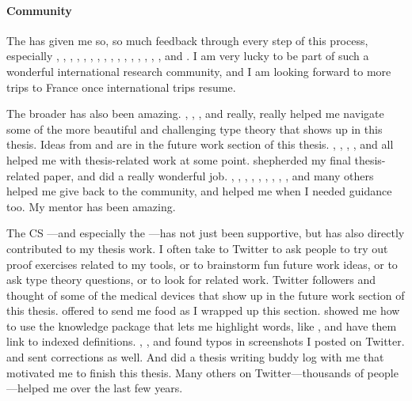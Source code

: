 \paragraph{Community}
The  has given me so, so much feedback through every step of this process,
especially , , , , , , , , , , , , , , , , and .
I am very lucky to be part of such a wonderful international research community, and I am looking forward to more trips to France
once international trips resume.

The broader  has also been amazing.
, , , and  really, really helped me navigate
some of the more beautiful and challenging type theory that shows up in this thesis.
Ideas from  and  are in the future work section of this thesis.
, , , , and  all helped me with
thesis-related work at some point.
 shepherded my final thesis-related paper, and did a really wonderful job.
, , , ,
, , , , , and many others helped me give back to the community,
and helped me when I needed guidance too.
My mentor  has been amazing.

The CS ---and especially the ---has not just been supportive,
but has also directly contributed to my thesis work.
I often take to Twitter to ask people to try out proof exercises related to my tools,
or to brainstorm fun future work ideas,
or to ask type theory questions,
or to look for related work.
Twitter followers  and  thought of some of the medical devices
that show up in the future work section of this thesis.
 offered to send me food as I wrapped up this section.
 showed me how to use the knowledge package that lets
me highlight words, like , and have them link to indexed definitions.
, , and  found typos in screenshots I posted on Twitter.
 and  sent corrections as well.
And  did a thesis writing buddy log with me that motivated me to finish this thesis.
Many others on Twitter---thousands of people---helped me over the last few years.


